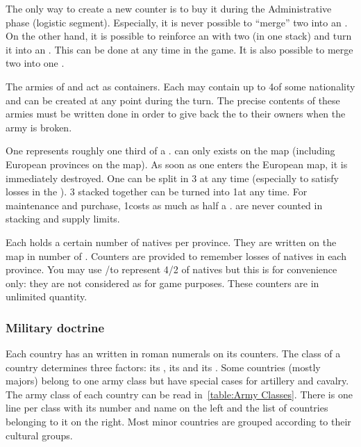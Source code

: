  The only way to create a new \ARMY
counter is to buy it during the Administrative phase (logistic segment).
\bparag Especially, it is never possible to ``merge'' two \LD into an
\ARMY\facemoins.
\bparag On the other hand, it is possible to reinforce an \ARMY\facemoins with
two \LD (in one stack) and turn it into an \ARMY\faceplus. This can be done at
any time in the game.
\bparag It is also possible to merge two \ARMY\facemoins into one
\ARMY\faceplus.

 The armies of  and 
act as containers. Each may contain up to 4\LD of some nationality and can be
created at any point during the turn. The precise contents of these armies
must be written done in order to give back the \LD to their owners when the
army is broken.

 One \LDE represents roughly one third of
a \LD.
\bparag \LDE can only exists on the \ROTW map (including European provinces on
the \ROTW map). As soon as one \LDE enters the European map, it is immediately
destroyed.
\bparag One \LD can be split in 3 \LDE at any time (especially to satisfy
losses in the \ROTW). 3 \LDE stacked together can be turned into 1\LD at any
time.
\bparag For maintenance and purchase, 1\LDE costs as much as half a \LD.
\bparag \LDE are never counted in stacking and supply limits.

\aparag[Natives.] Each \ROTW \Area holds a certain number of natives per
province. They are written on the \ROTW map in number of \LD.
\bparag Counters are provided to remember losses of natives in each
province. You may use \ARMY\faceplus/\facemoins to represent 4/2 \LD of
natives but this is for convenience only: they are not considered as \ARMY for
game purposes. These counters are in unlimited quantity.


\subsubsection{Military doctrine}
\aparag Each country has an  written in roman numerals on
its counters.
\bparag The class of a country determines three factors: its , its
 and its .
\bparag Some countries (mostly majors) belong to one army class but have
special cases for artillery and cavalry.
\bparag The army class of each country can be read in~\ref{table:Army
  Classes}. There is one line per class with its number and name on the left
and the list of countries belonging to it on the right.
\bparag Most minor countries are grouped according to their cultural groups.

